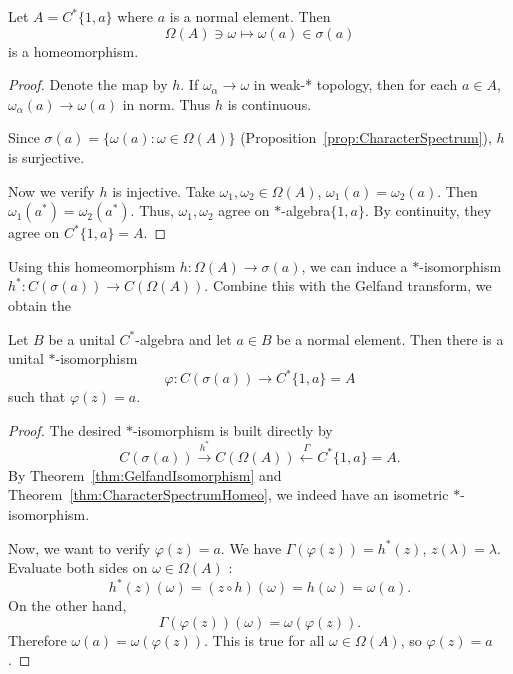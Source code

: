 \begin{theorem}
	\label{thm:CharacterSpectrumHomeo}
	Let $A = C^* \{1, a\} $ where $a$ is a normal element. Then
	\[
		\Omega(A) \ni \omega \mapsto \omega(a) \in \sigma(a)
	\] 
	is a homeomorphism.
\end{theorem}
\begin{proof}
	Denote the map by $h$.
	If $\omega_\alpha \to \omega$ in weak-* topology, then for each $a \in A$, $\omega_\alpha(a) \to \omega(a)$ in norm. Thus $h$ is continuous.

	Since $\sigma(a) = \{\omega(a): \omega \in \Omega(A)\} $ (Proposition~\ref{prop:CharacterSpectrum}), $h$ is surjective.

	Now we verify $h$ is injective. Take $\omega_1, \omega_2 \in \Omega(A)$, $\omega_1(a) = \omega_2(a)$. Then $\omega_1(a^*) = \omega_2(a^*)$. Thus, $\omega_1, \omega_2$ agree on $*$-algebra$\{1, a\} $. By continuity, they agree on $C^*\{1, a\}  = A$.
\end{proof}

Using this homeomorphism $h: \Omega(A) \to \sigma(a)$, we can induce a $*$-isomorphism $h^*: C(\sigma(a)) \to C(\Omega(A))$. Combine this with the Gelfand transform, we obtain the 

\begin{theorem}
	\label{thm:ContinuousFunctionalCalculus}
	Let $B$ be a unital $C^*$-algebra and let $a \in B$ be a normal element. Then there is a unital $*$-isomorphism
	\[
		\varphi: C(\sigma(a)) \to C^*\{1,a\} = A 
	\] 
	such that $\varphi(z) = a$.
\end{theorem}
\begin{proof}
	The desired $*$-isomorphism is built directly by
	\[
		C(\sigma(a)) \xrightarrow{h^*} C(\Omega(A))
		\xleftarrow{\Gamma} C^*\{1, a\}  = A
	.\] 
	By Theorem~\ref{thm:GelfandIsomorphism} and Theorem~\ref{thm:CharacterSpectrumHomeo}, we indeed have an isometric $*$-isomorphism.

	Now, we want to verify $\varphi(z) = a$. We have $\Gamma(\varphi(z)) = h^*(z)$, $z(\lambda) = \lambda$. Evaluate both sides on $\omega \in \Omega(A)$ :
	\[
		h^*(z)(\omega) = (z \circ h)(\omega) = h(\omega) = \omega(a)
	.\] 
	On the other hand,
	\[
		\Gamma(\varphi(z))(\omega) = \omega(\varphi(z))
	.\] 
	Therefore $\omega(a) = \omega(\varphi(z))$. This is true for all $\omega \in \Omega(A)$, so $\varphi(z) = a$.
\end{proof}


